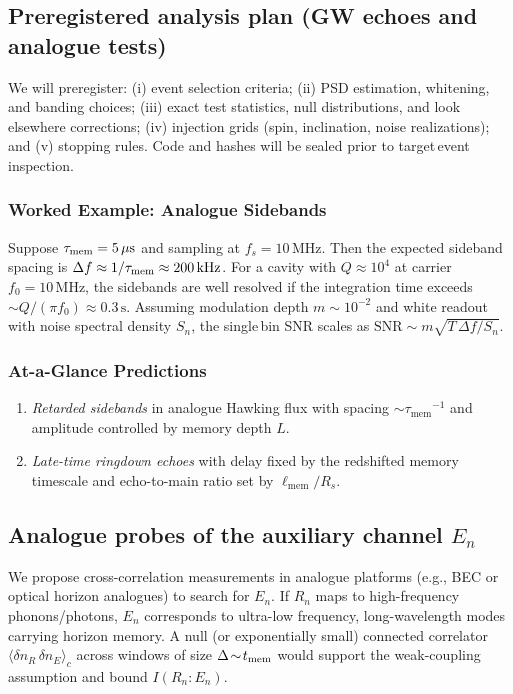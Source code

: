 \documentclass[aps,prd,preprint,onecolumn,superscriptaddress,nofootinbib,longbibliography,floatfix,11pt,showpacs,showkeys]{revtex4-2}
\newcommand{\ellmem}{\ensuremath{\ell_{\mathrm{mem}}}}
\newcommand{\taumem}{\ensuremath{\tau_{\mathrm{mem}}}}
\theoremstyle{plain}
\theoremstyle{definition}
\theoremstyle{remark}
\begin{document}
\subsection*{Preregistered analysis plan (GW echoes and analogue tests)}
We will preregister: (i) event selection criteria; (ii) PSD estimation, whitening, and banding choices; (iii) exact test statistics, null distributions, and look\,elsewhere corrections; (iv) injection grids (spin, inclination, noise realizations); and (v) stopping rules. Code and hashes will be sealed prior to target\,event inspection.

\subsubsection{Worked Example: Analogue Sidebands}
Suppose $\tau_{\rm mem}=5\,\mu\text{s}$ and sampling at $f_s=10\,\text{MHz}$. Then the expected sideband spacing is $\Delta f\approx 1/\tau_{\rm mem}\approx 200\,\text{kHz}$. For a cavity with $Q\approx 10^4$ at carrier $f_0=10\,\text{MHz}$, the sidebands are well resolved if the integration time exceeds $\sim Q/(\pi f_0)\approx 0.3\,\text{s}$. Assuming modulation depth $m\sim 10^{-2}$ and white readout with noise spectral density $S_n$, the single\,bin SNR scales as $\mathrm{SNR}\sim m \sqrt{T\,\Delta f / S_n}$.

% 
\subsubsection{At-a-Glance Predictions}
\begin{enumerate}
  \item \emph{Retarded sidebands} in analogue Hawking flux with spacing \(\sim \taumem^{-1}\) and amplitude controlled by memory depth \(L\).
  \item \emph{Late-time ringdown echoes} with delay fixed by the redshifted memory timescale and echo-to-main ratio set by \(\ellmem/R_s\).
\end{enumerate}

\subsection*{Analogue probes of the auxiliary channel $E_n$}
\label{sec:analogue-En}
We propose cross-correlation measurements in analogue platforms (e.g., BEC or optical horizon analogues) to search for $E_n$.
If $R_n$ maps to high-frequency phonons/photons, $E_n$ corresponds to ultra-low frequency, long-wavelength modes carrying horizon memory.
A null (or exponentially small) connected correlator $\langle \delta n_{R}\,\delta n_{E}\rangle_c$ across windows of size $\Delta\!\sim\!t_{\rm mem}$ would support the weak-coupling assumption and bound $I(R_n{:}E_n)$.
\end{document}
